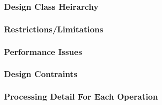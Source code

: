 \subsubsection{Design Class Heirarchy}
\label{sec:heirarchy}

\subsubsection{Restrictions/Limitations}
\label{sec:restrictions}

\subsubsection{Performance Issues}
\label{sec:performance}

\subsubsection{Design Contraints}
\label{sec:designconstraints}

\subsubsection{Processing Detail For Each Operation}
\label{sec:operation}

